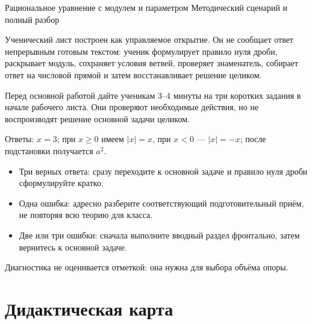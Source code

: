 \worksheettitle
  {Рациональное уравнение с модулем и параметром}
  {Методический сценарий и полный разбор}

\begin{teacherbox}
  Ученический лист построен как управляемое открытие. Он не сообщает ответ
  непрерывным готовым текстом: ученик формулирует правило нуля дроби,
  раскрывает модуль, сохраняет условия ветвей, проверяет знаменатель,
  собирает ответ на числовой прямой и затем восстанавливает решение целиком.
\end{teacherbox}

\begin{teacherbox}
  Перед основной работой дайте ученикам 3--4 минуты на три коротких задания
  в начале рабочего листа. Они проверяют необходимые действия, но не
  воспроизводят решение основной задачи целиком.

  Ответы: \(x=3\); при \(x\ge0\) имеем \(|x|=x\), при \(x<0\) ---
  \(|x|=-x\); после подстановки получается \(a^2\).
\end{teacherbox}

\begin{teacherbox}
  \begin{itemize}[itemsep=0.25em,topsep=0.25em]
    \item Три верных ответа: сразу переходите к основной задаче и правило
      нуля дроби сформулируйте кратко.
    \item Одна ошибка: адресно разберите соответствующий подготовительный
      приём, не повторяя всю теорию для класса.
    \item Две или три ошибки: сначала выполните вводный раздел фронтально,
      затем вернитесь к основной задаче.
  \end{itemize}
  Диагностика не оценивается отметкой: она нужна для выбора объёма опоры.
\end{teacherbox}

\section{Дидактическая карта}

